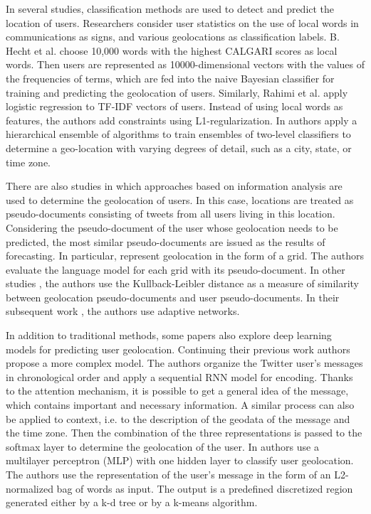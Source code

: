 In several studies, classification methods are used to detect and predict the location of users. Researchers consider user statistics on the use of local words in communications as signs, and various geolocations as classification labels. B. Hecht et al. \cite{HechtHongSuh} choose 10,000 words with the highest CALGARI scores as local words. Then users are represented as 10000-dimensional vectors with the values of the frequencies of terms, which are fed into the naive Bayesian classifier for training and predicting the geolocation of users. Similarly, Rahimi et al. \cite{RahimiVuCohn} apply logistic regression to TF-IDF vectors of users. Instead of using local words as features, the authors add constraints using L1-regularization. In \cite{MahmudNicholsDrews,MahmudNicholsDrews2014} authors apply a hierarchical ensemble of algorithms to train ensembles of two-level classifiers to determine a geo-location with varying degrees of detail, such as a city, state, or time zone.

There are also studies in which approaches based on information analysis are used to determine the geolocation of users. In this case, locations are treated as pseudo-documents consisting of tweets from all users living in this location. Considering the pseudo-document of the user whose geolocation needs to be predicted, the most similar pseudo-documents are issued as the results of forecasting. In particular, \cite{WingBaldridge} represent geolocation in the form of a grid. The authors evaluate the language model for each grid with its pseudo-document. In other studies \cite{RollerSperiosuRallapalli}, the authors use the Kullback-Leibler distance as a measure of similarity between geolocation pseudo-documents and user pseudo-documents. In their subsequent work \cite{WingBaldridge2014}, the authors use adaptive networks.

In addition to traditional methods, some papers also explore deep learning models for predicting user geolocation. Continuing their previous work \cite{MiuraTaniguchiTaniguchi,MiuraTaniguchiTaniguchi2017} authors propose a more complex model. The authors organize the Twitter user's messages in chronological order and apply a sequential RNN model for encoding. Thanks to the attention mechanism, it is possible to get a general idea of the message, which contains important and necessary information. A similar process can also be applied to context, i.e. to the description of the geodata of the message and the time zone. Then the combination of the three representations is passed to the softmax layer to determine the geolocation of the user. In \cite{RahimiCohnBaldwin} authors use a multilayer perceptron (MLP) with one hidden layer to classify user geolocation. The authors use the representation of the user's message in the form of an L2-normalized bag of words as input. The output is a predefined discretized region generated either by a k-d tree or by a k-means algorithm.

